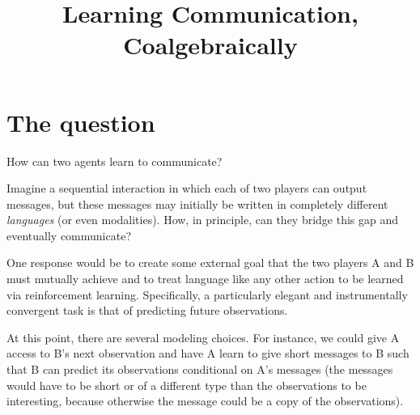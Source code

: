\documentclass{article}
\title{Learning Communication, Coalgebraically}
\author{}
\date{}
\theoremstyle{definition}
\begin{document}
\maketitle

\section{The question}

How can two agents learn to communicate?

Imagine a sequential interaction in which each of two players can output messages, but these messages may initially be written in completely different \emph{languages} (or even modalities).
How, in principle, can they bridge this gap and eventually communicate?

One response would be to create some external goal that the two players A and B must mutually achieve and to treat language like any other action to be learned via reinforcement learning. Specifically, a particularly elegant and instrumentally convergent task is that of predicting future observations. 

At this point, there are several modeling choices.
For instance, we could give A access to B's next observation and have A learn to give short messages to B such that B can predict its observations conditional on A's messages (the messages would have to be short or of a different type than the observations to be interesting, because otherwise the message could be a copy of the observations).
\end{document}
